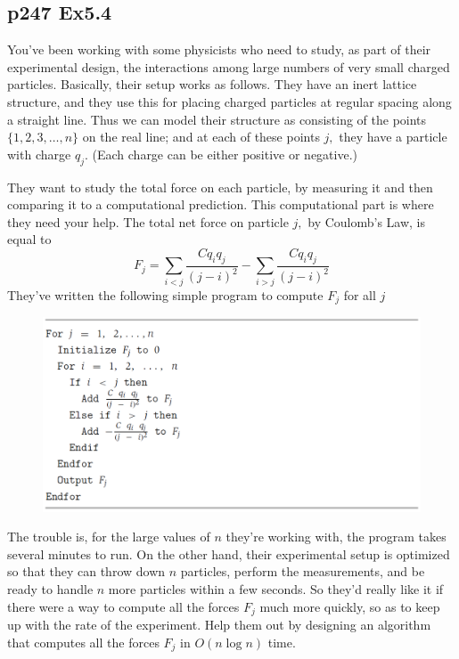 \documentclass[a4paper]{article}
\begin{document}
\subsection*{p247 Ex5.4}
\begin{adjustwidth}{1cm}{1cm}
	You've been working with some physicists who need to study, as part of their experimental design, the interactions among large numbers of very small charged particles. Basically, their setup works as follows. They have an inert lattice structure, and they use this for placing charged particles at regular spacing along a straight line. Thus we can model their structure as consisting of the points $\{1,2,3, \ldots, n\}$ on the real line; and at each of these points $j,$ they have a particle with charge $q_{j} .$ (Each charge can be either positive or negative.)

	They want to study the total force on each particle, by measuring it and then comparing it to a computational prediction. This computational part is where they need your help. The total net force on particle $j,$ by Coulomb's Law, is equal to
	$$
		F_{j}=\sum_{i<j} \frac{C q_{i} q_{j}}{(j-i)^{2}}-\sum_{i>j} \frac{C q_{i} q_{j}}{(j-i)^{2}}
	$$
	They've written the following simple program to compute $F_{j}$ for all $j$
	\begin{figure}[!htbp]
		\centering
		\includegraphics[width=12cm]{Pictures/EX5.4.png}
	\end{figure}

	The trouble is, for the large values of $n$ they're working with, the program takes several minutes to run. On the other hand, their experimental setup is optimized so that they can throw down $n$ particles, perform the measurements, and be ready to handle $n$ more particles within a few seconds. So they'd really like it if there were a way to compute all the forces $F_{j}$ much more quickly, so as to keep up with the rate of the experiment.
	Help them out by designing an algorithm that computes all the forces $F_{j}$ in $O(n \log n)$ time.
\end{adjustwidth}
\end{document}
